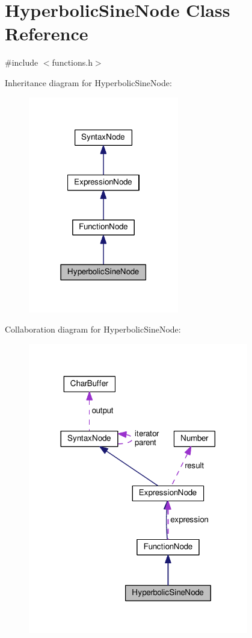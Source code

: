 \hypertarget{classHyperbolicSineNode}{}\section{Hyperbolic\+Sine\+Node Class Reference}
\label{classHyperbolicSineNode}


{\ttfamily \#include $<$functions.\+h$>$}



Inheritance diagram for Hyperbolic\+Sine\+Node\+:\nopagebreak
\begin{figure}[H]
\begin{center}
\leavevmode
\includegraphics[width=186pt]{classHyperbolicSineNode__inherit__graph}
\end{center}
\end{figure}


Collaboration diagram for Hyperbolic\+Sine\+Node\+:\nopagebreak
\begin{figure}[H]
\begin{center}
\leavevmode
\includegraphics[width=272pt]{classHyperbolicSineNode__coll__graph}
\end{center}
\end{figure}
